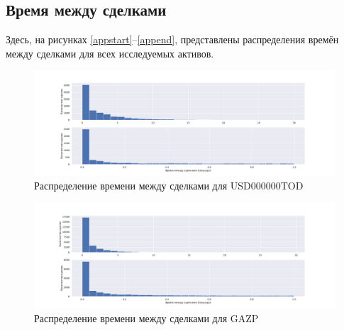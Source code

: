 \begin{appendices}
	

        \section{Время между сделками} \label{timedistr}
        Здесь, на рисунках \ref{appstart}--\ref{append}, представлены распределения времён между сделками для всех исследуемых активов.

        \begin{figure}
            \includegraphics[scale=0.35]{fig/timedistr/CU/USD000000TOD.pdf}
            \caption{Распределение времени между сделками для USD000000TOD}
            \label{TimeDistrUSD000000TOD}
        \end{figure}
        
        \begin{figure}
            \includegraphics[scale=0.35]{fig/timedistr/SE/GAZP.pdf}
            \caption{Распределение времени между сделками для GAZP}
            \label{TimeDistrGAZPWP}
        \end{figure}
        

\end{appendices}
